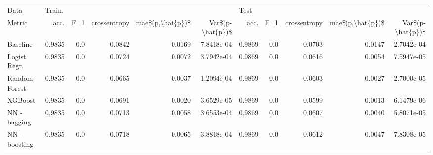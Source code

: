 \begin{tabular}{lrrrrrrrrrr}
\toprule
Data & \multicolumn{5}{l}{Train.} & \multicolumn{5}{l}{Test} \\
Metric &    acc. &  F\_1 & crossentropy & mae\$(p,\textbackslash hat\{p\})\$ & Var\$(p-\textbackslash hat\{p\})\$ &    acc. &  F\_1 & crossentropy & mae\$(p,\textbackslash hat\{p\})\$ & Var\$(p-\textbackslash hat\{p\})\$ \\
\midrule
Baseline      &  0.9835 &  0.0 &       0.0842 &           0.0169 &       7.8418e-04 &  0.9869 &  0.0 &       0.0703 &           0.0147 &       2.7042e-04 \\
Logist. Regr. &  0.9835 &  0.0 &       0.0724 &           0.0072 &       3.7942e-04 &  0.9869 &  0.0 &       0.0616 &           0.0054 &       7.5947e-05 \\
Random Forest &  0.9835 &  0.0 &       0.0665 &           0.0037 &       1.2094e-04 &  0.9869 &  0.0 &       0.0603 &           0.0027 &       2.7000e-05 \\
XGBoost       &  0.9835 &  0.0 &       0.0691 &           0.0020 &       3.6529e-05 &  0.9869 &  0.0 &       0.0599 &           0.0013 &       6.1479e-06 \\
NN - bagging  &  0.9835 &  0.0 &       0.0713 &           0.0058 &       3.6553e-04 &  0.9869 &  0.0 &       0.0607 &           0.0040 &       5.8071e-05 \\
NN - boosting &  0.9835 &  0.0 &       0.0718 &           0.0065 &       3.8818e-04 &  0.9869 &  0.0 &       0.0612 &           0.0047 &       7.8308e-05 \\
\bottomrule
\end{tabular}
